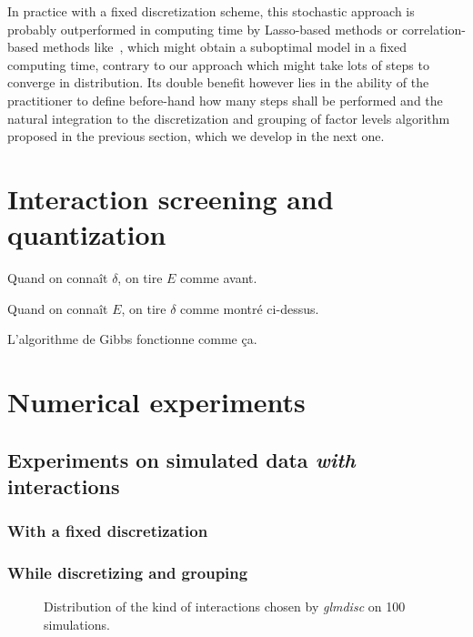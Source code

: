 {{{In practice with a fixed discretization scheme, this stochastic approach is probably outperformed in computing time by Lasso-based methods or correlation-based methods like~\cite{simon}, which might obtain a suboptimal model in a fixed computing time, contrary to our approach which might take lots of steps to converge in distribution. Its double benefit however lies in the ability of the practitioner to define before-hand how many steps shall be performed and the natural integration to the discretization and grouping of factor levels algorithm proposed in the previous section, which we develop in the next one.

\section{Interaction screening and quantization}

Quand on connaît $\delta$, on tire $E$ comme avant.

Quand on connaît $E$, on tire $\delta$ comme montré ci-dessus.

L'algorithme de Gibbs fonctionne comme ça.



\section{Numerical experiments}


\subsection{Experiments on simulated data \textit{with} interactions}

\subsubsection{With a fixed discretization}





\subsubsection{While discretizing and grouping}

\begin{figure}
\centering
\resizebox{\linewidth}{6cm}{%

}
\caption{\label{fig:simulated_interaction}Distribution of the kind of interactions chosen by \textit{glmdisc} on 100 simulations.}
\end{figure}




}}}
